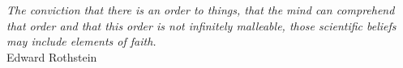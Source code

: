 \thispagestyle{empty}
    \null{}
        \begin{flushright}
                \emph{The conviction that there is an order to things, that
                the mind can comprehend that order and that this order
                is not infinitely malleable, those scientific beliefs
                may include elements of faith.}\\
              Edward Rothstein
        \end{flushright}
        \null


        
